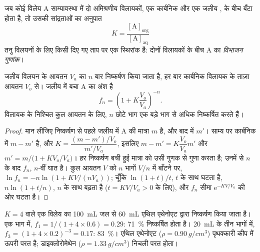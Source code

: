 \begin{definition}[विभाजन गुणांक]\label{def:b1:lab-techniques-1:partition-coefficient}
जब कोई विलेय A साम्यावस्था में दो अमिश्रणीय
विलायकों, एक कार्बनिक  और एक जलीय , के बीच बँटा होता है, तो उसकी
सांद्रताओं का अनुपात
\[
  K = \frac{[\mathrm{A}]_{\mathrm{org}}}{[\mathrm{A}]_{\mathrm{aq}}}
\]
तनु विलयनों के लिए किसी दिए गए ताप पर एक स्थिरांक है: दोनों
विलायकों के बीच A का \emph{विभाजन गुणांक}।
\end{definition}

\begin{proposition}[एक से अधिक निष्कर्षण एक से बेहतर हैं]\label{prop:b1:lab-techniques-1:multiple-extractions}
जलीय विलयन के आयतन $V_a$ का $n$ बार निष्कर्षण किया जाता है, हर बार कार्बनिक
विलायक के ताज़ा आयतन $V_o$ से। जलीय  में बचा A का
अंश है
\[
  f_n = \left(1 + K \frac{V_o}{V_a}\right)^{-n}.
\]
विलायक के निश्चित कुल आयतन के लिए, $n$ छोटे भाग
एक बड़े भाग से अधिक निष्कर्षित करते हैं।
\end{proposition}
\begin{proof}
मान लीजिए निष्कर्षण से पहले जलीय  में A की मात्रा $m$ है, और
बाद में $m'$। साम्य पर कार्बनिक  में $m - m'$ है, और
$K = \dfrac{(m - m')/V_o}{m'/V_a}$, इसलिए $m - m' = K\dfrac{V_o}{V_a} m'$ और
$m' = m\big/\bigl(1 + K V_o/V_a\bigr)$। हर निष्कर्षण बची हुई
मात्रा को उसी गुणक से गुणा करता है; उनमें से $n$ के बाद $f_n$, $n$-वीं
घात है। कुल आयतन $V$ को $n$ भागों $V/n$ में बाँटने पर,
$\ln f_n = -n \ln(1 + KV/(nV_a))$; चूँकि $\ln(1+t)/t$, $t$ के साथ घटता है,
$n \ln(1 + t/n)$, $n$ के साथ बढ़ता है ($t = KV/V_a > 0$ के लिए), और $f_n$
सीमा $\mathrm{e}^{-KV/V_a}$ की ओर घटता है।
\end{proof}

\begin{example}[एक भाग या तीन]
$K = 4$ वाले एक विलेय का \qty{100}{mL} जल से
\qty{60}{mL} एथिल एथेनोएट द्वारा निष्कर्षण किया जाता है। एक भाग में,
$f_1 = 1/(1 + 4 \times 0.6) = 0.29$: \qty{71}{\percent} निष्कर्षित होता है।
\qty{20}{mL} के तीन भागों में, $f_3 = (1 + 4 \times 0.2)^{-3} = 0.17$:
\qty{83}{\percent}। एथिल एथेनोएट ($\rho = \qty{0.90}{g/cm^3}$) पृथक्कारी कीप में
ऊपरी परत है; डाइक्लोरोमेथेन
($\rho = \qty{1.33}{g/cm^3}$) निचली परत होता।
\end{example}

